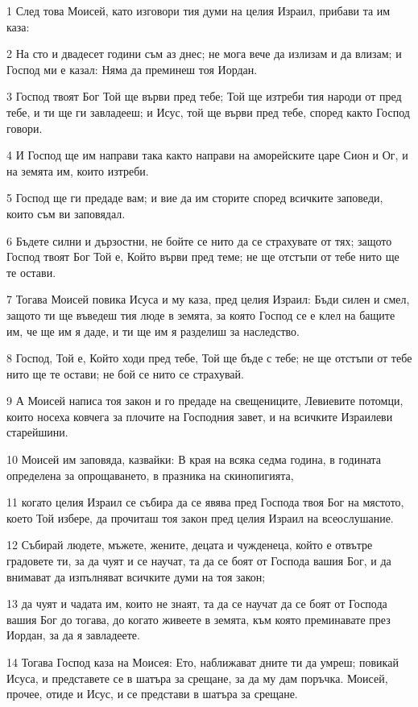 \par 1 След това Моисей, като изговори тия думи на целия Израил, прибави та им каза:
\par 2 На сто и двадесет години съм аз днес; не мога вече да излизам и да влизам; и Господ ми е казал: Няма да преминеш тоя Иордан.
\par 3 Господ твоят Бог Той ще върви пред тебе; Той ще изтреби тия народи от пред тебе, и ти ще ги завладееш; и Исус, той ще върви пред тебе, според както Господ говори.
\par 4 И Господ ще им направи така както направи на аморейските царе Сион и Ог, и на земята им, които изтреби.
\par 5 Господ ще ги предаде вам; и вие да им сторите според всичките заповеди, които съм ви заповядал.
\par 6 Бъдете силни и дързостни, не бойте се нито да се страхувате от тях; защото Господ твоят Бог Той е, Който върви пред теме; не ще отстъпи от тебе нито ще те остави.
\par 7 Тогава Моисей повика Исуса и му каза, пред целия Израил: Бъди силен и смел, защото ти ще въведеш тия люде в земята, за която Господ се е клел на бащите им, че ще им я даде, и ти ще им я разделиш за наследство.
\par 8 Господ, Той е, Който ходи пред тебе, Той ще бъде с тебе; не ще отстъпи от тебе нито ще те остави; не бой се нито се страхувай.
\par 9 А Моисей написа тоя закон и го предаде на свещениците, Левиевите потомци, които носеха ковчега за плочите на Господния завет, и на всичките Израилеви старейшини.
\par 10 Моисей им заповяда, казвайки: В края на всяка седма година, в годината определена за опрощаването, в празника на скинопигията,
\par 11 когато целия Израил се събира да се явява пред Господа твоя Бог на мястото, което Той избере, да прочиташ тоя закон пред целия Израил на всеослушание.
\par 12 Събирай людете, мъжете, жените, децата и чужденеца, който е отвътре градовете ти, за да чуят и се научат, та да се боят от Господа вашия Бог, и да внимават да изпълняват всичките думи на тоя закон;
\par 13 да чуят и чадата им, които не знаят, та да се научат да се боят от Господа вашия Бог до тогава, до когато живеете в земята, към която преминавате през Иордан, за да я завладеете.
\par 14 Тогава Господ каза на Моисея: Ето, наближават дните ти да умреш; повикай Исуса, и представете се в шатъра за срещане, за да му дам поръчка. Моисей, прочее, отиде и Исус, и се представи в шатъра за срещане.
